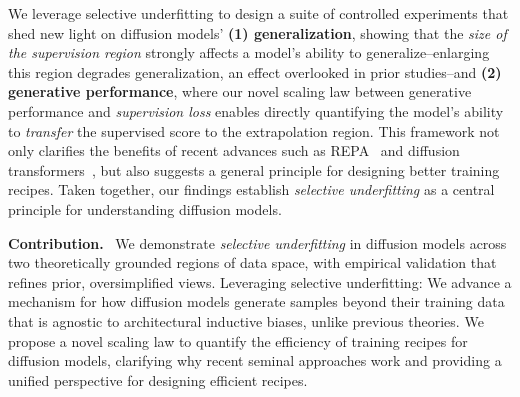 We leverage selective underfitting to design a suite of controlled experiments that shed new light on diffusion models' \textbf{(1) generalization}, showing that the \emph{size of the supervision region} strongly affects a model's ability to generalize--enlarging this region degrades generalization, an effect overlooked in prior studies--and \textbf{(2) generative performance}, where our novel scaling law between generative performance and \emph{supervision loss} enables directly quantifying the model's ability to \emph{transfer} the supervised score to the extrapolation region. This framework not only clarifies the benefits of recent advances such as REPA~\citep{yu2024representation} and diffusion transformers~\citep{peebles2023scalable,ma2024sit}, but also suggests a general principle for designing better training recipes. Taken together, our findings establish \emph{selective underfitting} as a central principle for understanding diffusion models.

\textbf{Contribution.}~ We demonstrate \emph{selective underfitting} in diffusion models across two theoretically grounded regions of data space, with empirical validation that refines prior, oversimplified views. Leveraging selective underfitting:  We advance a mechanism for how diffusion models generate samples beyond their training data that is agnostic to architectural inductive biases, unlike previous theories.  We propose a novel scaling law to quantify the efficiency of training recipes for diffusion models, clarifying why recent seminal approaches work and providing a unified perspective for designing efficient recipes.